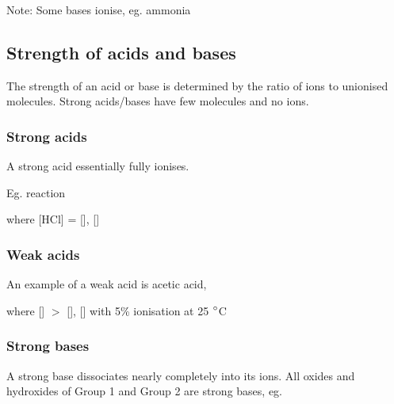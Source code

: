 		Note: Some bases ionise, eg. ammonia

		\begin{center}
		\end{center}

	\subsection{Strength of acids and bases}

		The strength of an acid or base is determined by the ratio of ions to unionised molecules. Strong acids/bases have few molecules and no ions.

		\subsubsection{Strong acids}
		
			A strong acid essentially fully ionises.

			Eg.  reaction

			\begin{center}
			\end{center}
			
			where [HCl] = [], []

		\subsubsection{Weak acids}
			
			An example of a weak acid is acetic acid, 

			\begin{center}
			\end{center}

			where [] $>$ [], [] with 5\% ionisation at 25 $\degree$C

		\subsubsection{Strong bases}
			
			A strong base dissociates nearly completely into its ions. All oxides and hydroxides of Group 1 and Group 2 are strong bases, eg. 

			\begin{center}
			\end{center}

